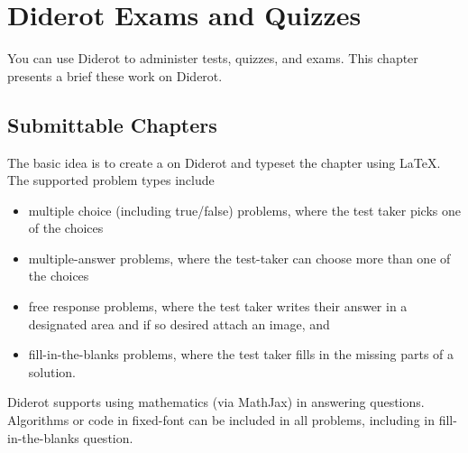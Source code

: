 \chapter{Diderot Exams and Quizzes}
\label{ch:quiz}

\begin{cluster}
\label{grp:prmbl:quiz::diderot}

\begin{preamble}
\label{prmbl:quiz::diderot}
You can use Diderot to administer tests, quizzes, and exams.  This chapter presents a brief these work on Diderot.

\end{preamble}
\end{cluster}


\section{Submittable Chapters}
\label{ch:quiz::submittable-chapters}

\begin{cluster}
\label{grp:grm:quiz::basic}

\begin{gram}
\label{grm:quiz::basic}
The basic idea is to create a  on Diderot and typeset the chapter using LaTeX.  The supported problem types include
\begin{itemize}
\item multiple choice (including true/false) problems, where the test taker picks one of the
  choices
\item multiple-answer problems, where the test-taker can choose more than one of the choices
\item free response problems, where the test taker writes their answer in a designated area and if so desired attach an image, and
\item fill-in-the-blanks problems, where the test taker fills in the missing parts of a solution.
\end{itemize}

\end{gram}
\end{cluster}

\begin{cluster}
\label{grp:grm:quiz::diderot}

\begin{gram}
\label{grm:quiz::diderot}
Diderot supports using mathematics (via MathJax) in answering questions.  
Algorithms or code in fixed-font can be included in all problems, including in fill-in-the-blanks question.

\end{gram}
\end{cluster}


